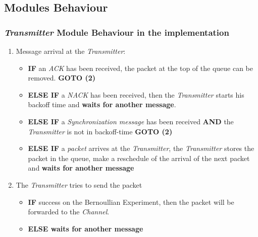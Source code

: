 \subsection{Modules Behaviour}
\subsubsection{\textit{Transmitter} Module Behaviour in the implementation}
\begin{enumerate}
	\item Message arrival at the \textit{Transmitter}:
	\begin{itemize}
		\item \textbf{IF} an \textit{ACK} has been received, the packet at the top of the queue can be removed. \textbf{GOTO (2)}
		\item \textbf{ELSE IF} a \textit{NACK} has been received, then the \textit{Transmitter} starts his backoff time and \textbf{waits for another message}.
		\item \textbf{ELSE IF} a \textit{Synchronization message} has been received \textbf{AND} the \textit{Transmitter} is not in backoff-time \textbf{GOTO (2)}
		\item \textbf{ELSE IF} a \textit{packet} arrives at the \textit{Transmitter}, the \textit{Transmitter} stores the packet in the queue, make a reschedule of the arrival of the next packet and \textbf{waits for another message}
	\end{itemize}
	\item The \textit{Transmitter} tries to send the packet
	\begin{itemize}
		\item \textbf{IF} success on the Bernoullian Experiment, then the packet will be forwarded to the \textit{Channel}.
		\item \textbf{ELSE waits for another message}
	\end{itemize}
\end{enumerate}
